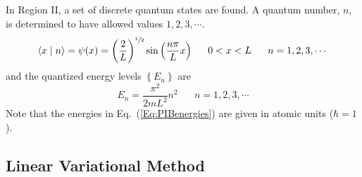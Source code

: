 In Region II, a set of discrete quantum states are found. A quantum number, $n$, is determined to have allowed values $1, 2, 3, \cdots{}$.
%
\begin{equation}
\displaystyle
  \braket{x}{n} = \psi(x) = \left(\frac{2}{L}\right)^{\sfrac{1}{2}}\sin{\left(\frac{n \pi}{L}x\right)}
    \,\,\,\,\,\,\,\,\,\,0<x<L\,\,\,\,\,\,\,\,\,\,n=1,2,3,\cdots{}
\end{equation}
%
and the quantized energy levels $\left\{E_n\right\}$ are
%
\begin{equation}\label{Eq:PIBenergies}
\displaystyle{}
  E_n = \frac{\pi^2}{2 m L^2}n^2\,\,\,\,\,\,\,\,\,\,n=1,2,3,\cdots{}
\end{equation}
%
Note that the energies in Eq.~(\ref{Eq:PIBenergies}) are given in atomic units ($\hbar=1$).

\subsection{Linear Variational Method}



%
%
%

